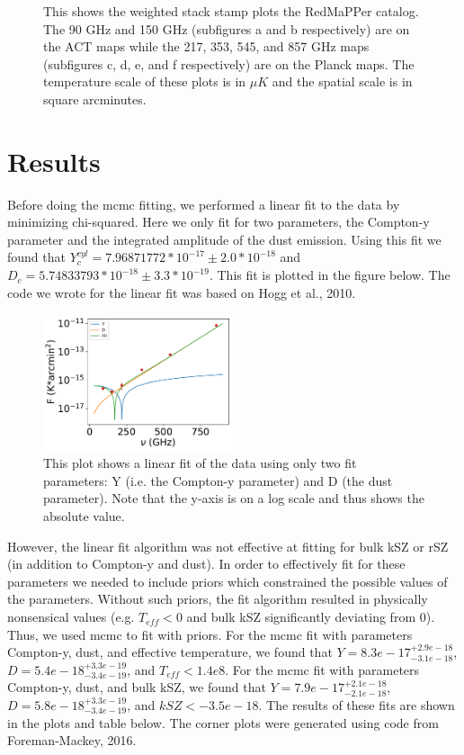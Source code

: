 \documentclass{princeton_astro_thesis}
\begin{document}
\begin{figure}[ht]
\begin{subfigure}[b]{0.1\linewidth}
    \caption{\label{fig:fig3}}
  \end{subfigure}
  \caption{This shows the weighted stack stamp plots the RedMaPPer catalog. The 90 GHz and 150 GHz (subfigures a and b respectively) are on the ACT maps while the 217, 353, 545, and 857 GHz maps (subfigures c, d, e, and f respectively) are on the Planck maps. The temperature scale of these plots is in $\mu K$ and the spatial scale is in square arcminutes.}
\end{figure}
\chapter{Results}
Before doing the mcmc fitting, we performed a linear fit to the data by minimizing chi-squared. Here we only fit for two parameters, the Compton-y parameter and the integrated amplitude of the dust emission. Using this fit we found that $Y^{cyl}_{c}=7.96871772*10^{-17}\pm 2.0*10^{-18}$ and $D_c=5.74833793*10^{-18}\pm 3.3*10^{-19}$. This fit is plotted in the figure below. The code we wrote for the linear fit was based on Hogg et al., 2010.

\begin{figure}[h]
\centering
\includegraphics[width=0.5\textwidth]{../redmapper_apfluxes_fitlog.pdf}
\caption{This plot shows a linear fit of the data using only two fit parameters: Y (i.e. the Compton-y parameter) and D (the dust parameter). Note that the y-axis is on a log scale and thus shows the absolute value.}
\end{figure}

\par However, the linear fit algorithm was not effective at fitting for bulk kSZ or rSZ (in addition to Compton-y and dust). In order to effectively fit for these parameters we needed to include priors which constrained the possible values of the parameters. Without such priors, the fit algorithm resulted in physically nonsensical values (e.g. $T_{eff}<0$ and bulk kSZ significantly deviating from 0). Thus, we used mcmc to fit with priors. For the mcmc fit with parameters Compton-y, dust, and effective temperature, we found that $Y=8.3e-17^{+2.9e-18}_{-3.1e-18}$, $D=5.4e-18^{+3.3e-19}_{-3.4e-19}$, and $T_{eff}<1.4e8$. For the mcmc fit with parameters Compton-y, dust, and bulk kSZ, we found that $Y=7.9e-17^{+2.1e-18}_{-2.1e-18}$, $D=5.8e-18^{+3.3e-19}_{-3.4e-19}$, and $kSZ<-3.5e-18$. The results of these fits are shown in the plots and table below. The corner plots were generated using code from Foreman-Mackey, 2016. 
\end{document}
